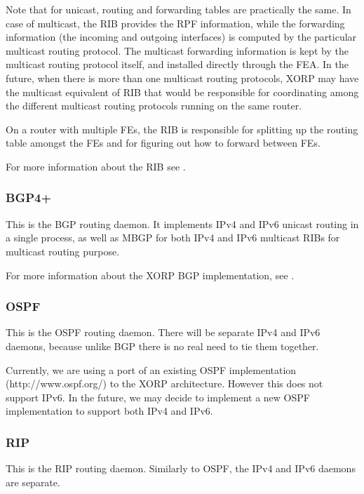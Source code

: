 \documentclass[11pt]{article}
\begin{document}
Note that for unicast, routing and forwarding tables are practically the
same. In case of multicast, the RIB provides the RPF information, while
the forwarding information (the incoming and outgoing interfaces) is
computed by the particular multicast routing protocol. The multicast
forwarding information is kept by the multicast routing protocol itself, and
installed directly through the FEA. In the future, when there is more
than one multicast routing protocols, XORP may have the multicast
equivalent of RIB that would be responsible for coordinating among the
different multicast routing protocols running on the same router.

On a router with multiple FEs, the RIB is responsible for splitting
up the routing table amongst the FEs and for figuring out how to forward
between FEs.

For more information about the RIB see \cite{xorp:rib}.

\subsubsection{BGP4+}

This is the BGP routing daemon. It implements IPv4 and IPv6 unicast
routing in a single process, as well as MBGP for both IPv4 and IPv6
multicast RIBs for multicast routing purpose.

For more information about the XORP BGP implementation, see \cite{xorp:bgp}.

\subsubsection{OSPF}

This is the OSPF routing daemon. There will be separate IPv4 and IPv6
daemons, because unlike BGP there is no real need to tie them together.

Currently, we are using a port of an existing OSPF implementation
(http://www.ospf.org/) to the XORP architecture.  However this does
not support IPv6.  In the future, we may decide to implement a new
OSPF implementation to support both IPv4 and IPv6.

\subsubsection{RIP}

This is the RIP routing daemon. Similarly to OSPF, the IPv4 and IPv6
daemons are separate.
\end{document}
